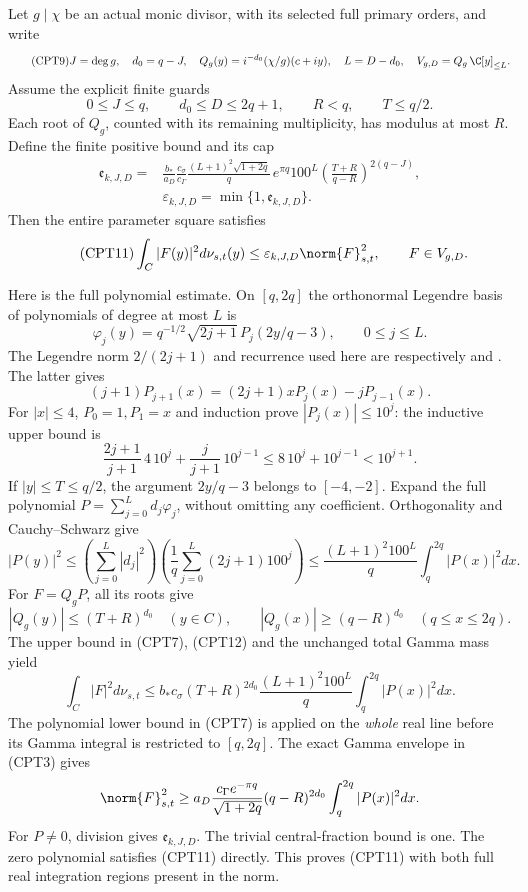 \documentclass[11pt,a4paper]{article}
\begin{document}
Let \(g\mid\chi\) be an actual monic divisor, with its selected full
primary orders, and write
\begin{equation}\tag{CPT9}
 J=\deg g,\quad d_0=q-J,\quad
 Q_g(y)=i^{-d_0}(\chi/g)(c+iy),\quad
 L=D-d_0,\quad
 V_{g,D}=Q_g\,\C[y]_{\le L}.
\end{equation}
Assume the explicit finite guards
\[
 0\le J\le q,\qquad d_0\le D\le2q+1,\qquad
 R<q,\qquad T\le q/2.
\]
Each root of \(Q_g\), counted with its remaining multiplicity, has
modulus at most \(R\).  Define the finite positive bound and its cap
\begin{equation}\tag{CPT10}
\begin{split}
 \mathfrak e_{k,J,D}
 ={}&\frac{b_*}{a_D}\frac{c_\sigma}{c_\Gamma}
 \frac{(L+1)^2\sqrt{1+2q}}q\,e^{\pi q}100^L
 \left(\frac{T+R}{q-R}\right)^{2(q-J)},\\
 &\varepsilon_{k,J,D}=\min\{1,\mathfrak e_{k,J,D}\}.
\end{split}
\end{equation}
Then the entire parameter square satisfies
\begin{equation}\tag{CPT11}
 \int_C |F(y)|^2d\nu_{s,t}(y)
 \le\varepsilon_{k,J,D}\norm{F}_{s,t}^2,
 \qquad F\in V_{g,D}.
\end{equation}

Here is the full polynomial estimate.  On \([q,2q]\) the
orthonormal Legendre basis of polynomials of degree at most \(L\)
is
\[
 \varphi_j(y)=q^{-1/2}\sqrt{2j+1}\,
 P_j(2y/q-3),\qquad 0\le j\le L.
\]
The Legendre norm \(2/(2j+1)\) and recurrence used here are
respectively \cite[Table 18.3.1]{cpt:dlmfLegendreNorm} and
\cite[Table 18.9.1]{cpt:dlmfLegendreRec}.  The latter gives
\[
 (j+1)P_{j+1}(x)=(2j+1)xP_j(x)-jP_{j-1}(x).
\]
For \(|x|\le4\), \(P_0=1,P_1=x\) and induction prove
\(|P_j(x)|\le10^j\): the inductive upper bound is
\[
 \frac{2j+1}{j+1}\,4\,10^j+
 \frac{j}{j+1}\,10^{j-1}
 \le8\,10^j+10^{j-1}<10^{j+1}.
\]
If \(|y|\le T\le q/2\), the argument \(2y/q-3\) belongs to
\([-4,-2]\).  Expand the full polynomial
\(P=\sum_{j=0}^L d_j\varphi_j\), without omitting any coefficient.
Orthogonality and Cauchy--Schwarz give
\begin{equation}\tag{CPT12}
 |P(y)|^2\le
 \left(\sum_{j=0}^L|d_j|^2\right)
 \left(\frac1q\sum_{j=0}^L(2j+1)100^j\right)
 \le\frac{(L+1)^2 100^L}{q}
                       \int_q^{2q}|P(x)|^2dx .
\end{equation}
For \(F=Q_gP\), all its roots give
\[
 |Q_g(y)|\le(T+R)^{d_0}\quad(y\in C),\qquad
 |Q_g(x)|\ge(q-R)^{d_0}\quad(q\le x\le2q).
\]
The upper bound in (CPT7), (CPT12) and the unchanged total Gamma
mass yield
\[
 \int_C|F|^2d\nu_{s,t}
 \le b_*c_\sigma(T+R)^{2d_0}
       \frac{(L+1)^2 100^L}{q}\int_q^{2q}|P(x)|^2dx.
\]
The polynomial lower bound in (CPT7) is applied on the \emph{whole}
real line before its Gamma integral is restricted to \([q,2q]\).
The exact Gamma envelope in (CPT3) gives
\[
 \norm{F}_{s,t}^2
 \ge a_D\frac{c_\Gamma e^{-\pi q}}{\sqrt{1+2q}}
           (q-R)^{2d_0}\int_q^{2q}|P(x)|^2dx .
\]
For \(P\ne0\), division gives \(\mathfrak e_{k,J,D}\).
The trivial central-fraction bound is one.  The zero polynomial
satisfies (CPT11) directly.  This proves (CPT11) with both full
real integration regions present in the norm.
\end{document}
